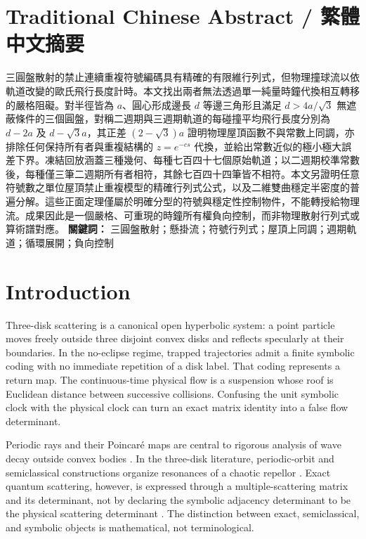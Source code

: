 \documentclass[11pt,a4paper]{article}
\theoremstyle{definition}
\theoremstyle{remark}
\begin{document}
\begin{otherlanguage}{chinese-traditional}
\section*{Traditional Chinese Abstract / 繁體中文摘要}
三圓盤散射的禁止連續重複符號編碼具有精確的有限維行列式，但物理撞球流以依軌道改變的歐氏飛行長度計時。本文找出兩者無法透過單一純量時鐘代換相互轉移的嚴格阻礙。對半徑皆為 \(a\)、圓心形成邊長 \(d\) 等邊三角形且滿足 \(d>4a/\sqrt3\) 無遮蔽條件的三個圓盤，對稱二週期與三週期軌道的每碰撞平均飛行長度分別為 \(d-2a\) 及 \(d-\sqrt3a\)，其正差 \((2-\sqrt3)a\) 證明物理屋頂函數不與常數上同調，亦排除任何保持所有者與重複結構的 \(z=e^{-cs}\) 代換，並給出常數近似的極小極大誤差下界。凍結回放涵蓋三種幾何、每種七百四十七個原始軌道；以二週期校準常數後，每種僅三筆二週期所有者相符，其餘七百四十四筆皆不相符。本文另證明任意符號數之單位屋頂禁止重複模型的精確行列式公式，以及二維雙曲穩定半密度的普遍分解。這些正面定理僅屬於明確分型的符號與穩定性控制物件，不能轉授給物理流。成果因此是一個嚴格、可重現的時鐘所有權負向控制，而非物理散射行列式或算術譜對應。
\noindent\textbf{關鍵詞：} 三圓盤散射；懸掛流；符號行列式；屋頂上同調；週期軌道；循環展開；負向控制
\end{otherlanguage}

\section{Introduction}

Three-disk scattering is a canonical open hyperbolic system: a point particle moves freely outside three disjoint convex disks and reflects specularly at their boundaries. In the no-eclipse regime, trapped trajectories admit a finite symbolic coding with no immediate repetition of a disk label. That coding represents a return map. The continuous-time physical flow is a suspension whose roof is Euclidean distance between successive collisions. Confusing the unit symbolic clock with the physical clock can turn an exact matrix identity into a false flow determinant.

Periodic rays and their Poincaré maps are central to rigorous analysis of wave decay outside convex bodies \citep[Introduction and theorem statements]{Ikawa1988}.
In the three-disk literature, periodic-orbit and semiclassical constructions organize resonances of a chaotic repellor \citep[Secs.~II--IV]{GaspardRice1989Semiclassical}.
Exact quantum scattering, however, is expressed through a multiple-scattering matrix and its determinant, not by declaring the symbolic adjacency determinant to be the physical scattering determinant \citep[abstract and Secs.~II--III]{GaspardRice1989Exact}. The distinction between exact, semiclassical, and symbolic objects is mathematical, not terminological.
\end{document}
